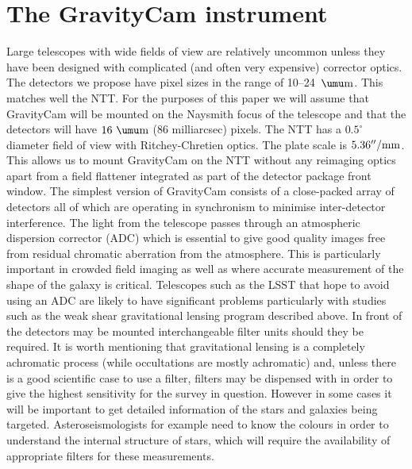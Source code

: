 \documentclass{pasa}%
\newcommand\arcsec{\hbox{$^{\prime\prime}$}}
\begin{document}
\section{The GravityCam instrument}
\label{Sect:Instrument}

Large telescopes with wide fields of view are relatively uncommon unless they have been designed with complicated (and often very expensive) corrector optics.  The detectors we propose have pixel sizes in the range of 10--24~$\umu\mbox{m}$. This matches well the NTT.  For the purposes of this paper we will assume that \mbox{GravityCam} will be mounted on the Naysmith focus of the telescope and that the detectors will have $16~\umu\mbox{m}$ (86 milliarcsec) pixels.  The NTT has a $0.5^\circ$ diameter field of view with Ritchey-Chretien optics.  The plate scale is $5.36\arcsec/\mbox{mm}$.  This allows us to mount \mbox{GravityCam} on the NTT without any reimaging optics apart from a field flattener integrated as part of the detector package 
front window. The simplest version of \mbox{GravityCam} consists of a close-packed array of detectors all of which are operating in synchronism to minimise inter-detector interference.  The light from the telescope passes through an atmospheric dispersion corrector (ADC) which is essential to give good quality images free from residual chromatic aberration from the atmosphere.  This is particularly important in crowded field imaging as well as where accurate measurement of the shape of the galaxy is critical.  Telescopes such as the LSST that hope to avoid using an ADC are likely to have significant problems particularly with studies such as the weak shear gravitational lensing program described above.  In front of the detectors may be mounted interchangeable filter units should they be required.  It is worth mentioning that gravitational lensing is a completely achromatic process (while occultations are mostly achromatic) and, unless there is a good scientific case to use a filter, filters may be dispensed with in order to give the highest sensitivity for the survey in question.  However in some cases it will be important to get detailed information of the stars and galaxies being targeted. Asteroseismologists for example need to know the colours in order to understand the internal structure of stars, which will require the availability of appropriate filters for these measurements.
\end{document}
